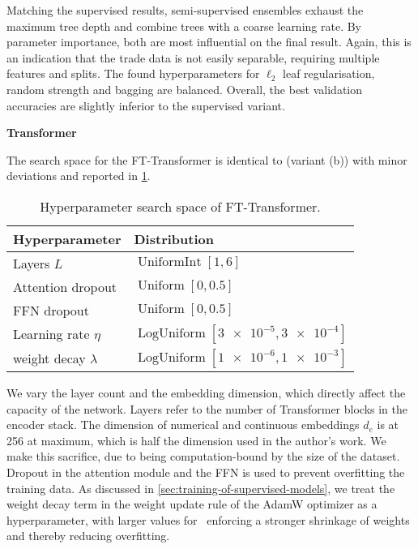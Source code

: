Matching the supervised results, semi-supervised ensembles exhaust the maximum tree depth and combine trees with a coarse learning rate. By parameter importance, both are most influential on the final result. Again, this is an indication that the trade data is not easily separable, requiring multiple features and splits. The found hyperparameters for $\ell_2$ leaf regularisation, random strength and bagging are balanced. Overall, the best validation accuracies are slightly inferior to the supervised variant.

\clearpage

\textbf{Transformer}

The search space for the FT-Transformer is identical to \textcite[][18]{gorishniyRevisitingDeepLearning2021} (variant (b)) with minor deviations and reported in \cref{tab:hyperparameter-space-2}.

\begin{table}[!h]
    \centering
    \caption[Hyperparameter Search Space of FT-Transformer]{Hyperparameter search space of FT-Transformer.}
    \label{tab:hyperparameter-space-2}
    \begin{tabular}{@{}ll@{}}
        \toprule
        Hyperparameter         & Distribution                                        \\ \midrule
        Layers $L$             & $\operatorname{UniformInt}[1,6]$                    \\
        Attention dropout      & $\operatorname{Uniform}[0, 0.5]$                    \\
        \gls{FFN} dropout      & $\operatorname{Uniform}[0, 0.5]$                    \\
        Learning rate $\eta$   & $\operatorname{LogUniform}[\num{3e-5}, \num{3e-4}]$ \\
        weight decay $\lambda$ & $\operatorname{LogUniform}[\num{1e-6}, \num{1e-3}]$ \\ \bottomrule
    \end{tabular}
\end{table}

We vary the layer count and the embedding dimension, which directly affect the capacity of the network. Layers refer to the number of Transformer blocks in the encoder stack. The dimension of numerical and continuous embeddings $d_e$ is at \num{256} at maximum, which is half the dimension used in the author's work. We make this sacrifice, due to being computation-bound by the size of the dataset. Dropout in the attention module and the \gls{FFN} is used to prevent overfitting the training data. As discussed in \cref{sec:training-of-supervised-models}, we treat the weight decay term in the weight update rule of the AdamW optimizer as a hyperparameter, with larger values for \lambda~enforcing a stronger shrinkage of weights and thereby reducing overfitting.

